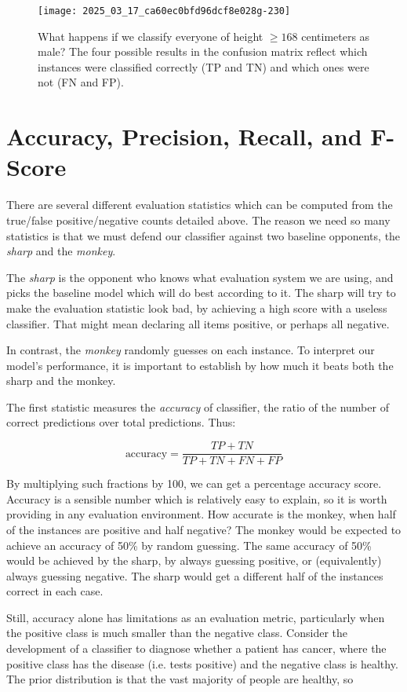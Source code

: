 \documentclass[10pt]{article}
\begin{document}
\begin{figure}[h]
    \centering
    \texttt{[image: 2025\_03\_17\_ca60ec0bfd96dcf8e028g-230]}
    \caption{What happens if we classify everyone of height $\geq 168$ centimeters as male? The four possible results in the confusion matrix reflect which instances were classified correctly (TP and TN) and which ones were not (FN and FP).}
\end{figure}

\section{Accuracy, Precision, Recall, and F-Score}
There are several different evaluation statistics which can be computed from the true/false positive/negative counts detailed above. The reason we need so many statistics is that we must defend our classifier against two baseline opponents, the \textit{sharp} and the \textit{monkey}.

The \textit{sharp} is the opponent who knows what evaluation system we are using, and picks the baseline model which will do best according to it. The sharp will try to make the evaluation statistic look bad, by achieving a high score with a useless classifier. That might mean declaring all items positive, or perhaps all negative.

In contrast, the \textit{monkey} randomly guesses on each instance. To interpret our model's performance, it is important to establish by how much it beats both the sharp and the monkey.

The first statistic measures the \textit{accuracy} of classifier, the ratio of the number of correct predictions over total predictions. Thus:

\[
\text{accuracy} = \frac{TP + TN}{TP + TN + FN + FP}
\]

By multiplying such fractions by 100, we can get a percentage accuracy score.
Accuracy is a sensible number which is relatively easy to explain, so it is worth providing in any evaluation environment. How accurate is the monkey, when half of the instances are positive and half negative? The monkey would be expected to achieve an accuracy of 50\% by random guessing. The same accuracy of 50\% would be achieved by the sharp, by always guessing positive, or (equivalently) always guessing negative. The sharp would get a different half of the instances correct in each case.

Still, accuracy alone has limitations as an evaluation metric, particularly when the positive class is much smaller than the negative class. Consider the development of a classifier to diagnose whether a patient has cancer, where the positive class has the disease (i.e. tests positive) and the negative class is healthy. The prior distribution is that the vast majority of people are healthy, so
\end{document}
